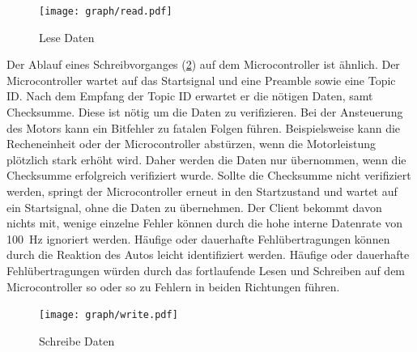 \begin{figure}[ht]
\centering
\texttt{[image: graph/read.pdf]} 
\caption{Lese Daten}
\label{fig:uC_read}
\end{figure}

Der Ablauf eines Schreibvorganges (\cref{fig:uC_write}) auf dem Microcontroller ist ähnlich. Der Microcontroller wartet auf das Startsignal und eine Preamble sowie eine Topic ID.
Nach dem Empfang der Topic ID erwartet er die nötigen Daten, samt Checksumme. Diese ist nötig um die Daten zu verifizieren. Bei der Ansteuerung des Motors kann ein
Bitfehler zu fatalen Folgen führen. Beispielsweise kann die Recheneinheit oder der Microcontroller abstürzen, wenn die Motorleistung plötzlich stark erhöht wird.
Daher werden die Daten nur übernommen, wenn die Checksumme erfolgreich verifiziert wurde. Sollte die Checksumme nicht verifiziert werden, springt der Microcontroller
erneut in den Startzustand und wartet auf ein Startsignal, ohne die Daten zu übernehmen. Der Client bekommt davon nichts mit, wenige einzelne Fehler können durch die
hohe interne Datenrate von \SI{100}{\Hz} ignoriert werden. Häufige oder dauerhafte Fehlübertragungen können durch die Reaktion des Autos leicht identifiziert werden.
Häufige oder dauerhafte Fehlübertragungen würden durch das fortlaufende Lesen und Schreiben auf dem Microcontroller so oder so zu Fehlern in beiden Richtungen führen.

\begin{figure}[ht]
\centering
\texttt{[image: graph/write.pdf]} 
\caption{Schreibe Daten}
\label{fig:uC_write}
\end{figure}





